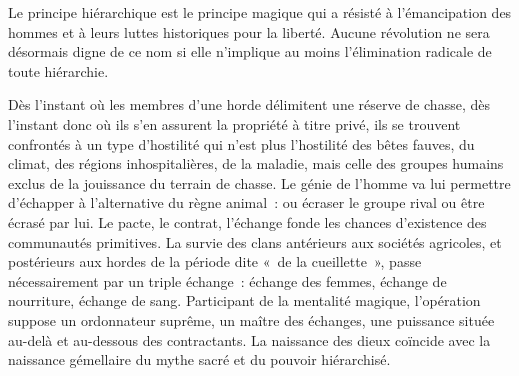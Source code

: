 \documentclass[french,twoside]{book} %
\newcommand{\astermono}{\medskip\centerline{\color{rubric}\large\selectfont{\syms ✻}}\medskip\par}%
\begin{document}
Le principe hiérarchique est le principe magique qui a résisté à l’émancipation des hommes et à leurs luttes historiques pour la liberté. Aucune révolution ne sera désormais digne de ce nom si elle n’implique au moins l’élimination radicale de toute hiérarchie.\par

\astermono

\noindent Dès l’instant où les membres d’une horde délimitent une réserve de chasse, dès l’instant donc où ils s’en assurent la propriété à titre privé, ils se trouvent confrontés à un type d’hostilité qui n’est plus l’hostilité des bêtes fauves, du climat, des régions inhospitalières, de la maladie, mais celle des groupes humains exclus de la jouissance du terrain de chasse. Le génie de l’homme va lui permettre d’échapper à l’alternative du règne animal : ou écraser le groupe rival ou être écrasé par lui. Le pacte, le contrat, l’échange fonde les chances d’existence des communautés primitives. La survie des clans antérieurs aux sociétés agricoles, et postérieurs aux hordes de la période dite « de la cueillette », passe nécessairement par un triple échange : échange des femmes, échange de nourriture, échange de sang. Participant de la mentalité magique, l’opération suppose un ordonnateur suprême, un maître des échanges, une puissance située au-delà et au-dessous des contractants. La naissance des dieux coïncide avec la naissance gémellaire du mythe sacré et du pouvoir hiérarchisé.\par
\end{document}
